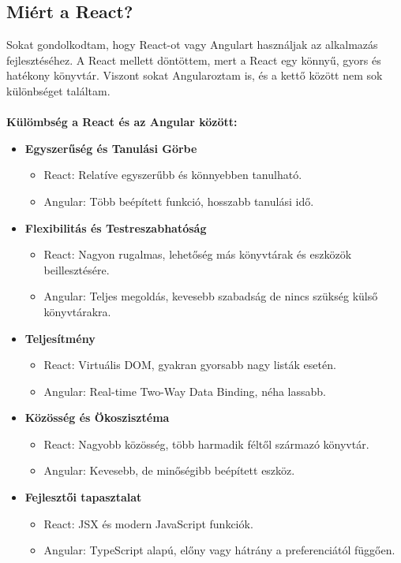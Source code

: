 \subsection*{Miért a React?}
Sokat gondolkodtam, hogy React-ot vagy Angulart használjak az alkalmazás fejlesztéséhez.
A React mellett döntöttem, mert a React egy könnyű, gyors és hatékony könyvtár.
Viszont sokat Angularoztam is, és a kettő között nem sok különbséget találtam.
\\
\\
\textbf{Külömbség a React és az Angular között:}
\begin{itemize}[noitemsep, nolistsep]
    \item \textbf{Egyszerűség és Tanulási Görbe}
          \begin{itemize}
              \item React: Relatíve egyszerűbb és könnyebben tanulható.
              \item Angular: Több beépített funkció, hosszabb tanulási idő.
          \end{itemize}

    \item \textbf{Flexibilitás és Testreszabhatóság}
          \begin{itemize}
              \item React: Nagyon rugalmas, lehetőség más könyvtárak és eszközök beillesztésére.
              \item Angular: Teljes megoldás, kevesebb szabadság de nincs szükség külső könyvtárakra.
          \end{itemize}

    \item \textbf{Teljesítmény}
          \begin{itemize}
              \item React: Virtuális DOM, gyakran gyorsabb nagy listák esetén.
              \item Angular: Real-time Two-Way Data Binding, néha lassabb.
          \end{itemize}

    \item \textbf{Közösség és Ökoszisztéma}
          \begin{itemize}
              \item React: Nagyobb közösség, több harmadik féltől származó könyvtár.
              \item Angular: Kevesebb, de minőségibb beépített eszköz.
          \end{itemize}

    \item \textbf{Fejlesztői tapasztalat}
          \begin{itemize}
              \item React: JSX és modern JavaScript funkciók.
              \item Angular: TypeScript alapú, előny vagy hátrány a preferenciától függően.
          \end{itemize}
\end{itemize}
